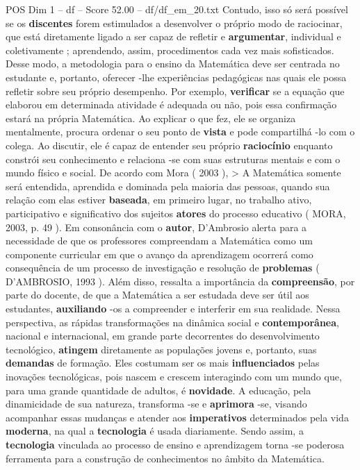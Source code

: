 \begin{textsample}{POS Dim 1 – df – Score 52.00 – df/df\_em\_20.txt}
Contudo, isso só será possível se os \textbf{discentes} forem estimulados a desenvolver o próprio modo de raciocinar, que está diretamente ligado a ser capaz de refletir e \textbf{argumentar}, individual e coletivamente ; aprendendo, assim, procedimentos cada vez mais sofisticados.
Desse modo, a metodologia para o ensino da Matemática deve ser centrada no estudante e, portanto, oferecer -lhe experiências pedagógicas nas quais ele possa refletir sobre seu próprio desempenho.
Por exemplo, \textbf{verificar} se a equação que elaborou em determinada atividade é adequada ou não, pois essa confirmação estará na própria Matemática.
Ao explicar o que fez, ele se organiza mentalmente, procura ordenar o seu ponto de \textbf{vista} e pode compartilhá -lo com o colega.
Ao discutir, ele é capaz de entender seu próprio \textbf{raciocínio} enquanto constrói seu conhecimento e relaciona -se com suas estruturas mentais e com o mundo físico e social.
De acordo com Mora ( 2003 ), > A Matemática somente será entendida, aprendida e dominada pela maioria das pessoas, quando sua relação com elas estiver \textbf{baseada}, em primeiro lugar, no trabalho ativo, participativo e significativo dos sujeitos \textbf{atores} do processo educativo ( MORA, 2003, p. 49 ).
Em consonância com o \textbf{autor}, D’Ambrosio alerta para a necessidade de que os professores compreendam a Matemática como um componente curricular em que o avanço da aprendizagem ocorrerá como consequência de um processo de investigação e resolução de \textbf{problemas} ( D’AMBROSIO, 1993 ).
Além disso, ressalta a importância da \textbf{compreensão}, por parte do docente, de que a Matemática a ser estudada deve ser útil aos estudantes, \textbf{auxiliando} -os a compreender e interferir em sua realidade.
Nessa perspectiva, as rápidas transformações na dinâmica social e \textbf{contemporânea}, nacional e internacional, em grande parte decorrentes do desenvolvimento tecnológico, \textbf{atingem} diretamente as populações jovens e, portanto, suas \textbf{demandas} de formação.
Eles costumam ser os mais \textbf{influenciados} pelas inovações tecnológicas, pois nascem e crescem interagindo com um mundo que, para uma grande quantidade de adultos, é \textbf{novidade}.
A educação, pela dinamicidade de sua natureza, transforma -se e \textbf{aprimora} -se, visando acompanhar essas mudanças e atender aos \textbf{imperativos} determinados pela vida \textbf{moderna}, na qual a \textbf{tecnologia} é usada diariamente.
Sendo assim, a \textbf{tecnologia} vinculada ao processo de ensino e aprendizagem torna -se poderosa ferramenta para a construção de conhecimentos no âmbito da Matemática.

\end{textsample}

